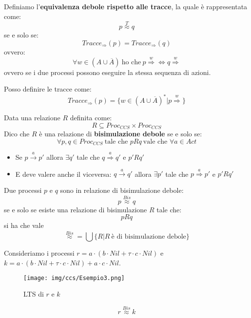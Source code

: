 \begin{definizione}
    Definiamo l'\textbf{equivalenza debole rispetto alle tracce}, la quale è rappresentata come: $$p \stackrel{T}{\approx} q$$ se e solo se: $$Tracce_{\Rightarrow} (p) = Tracce_{\Rightarrow}(q)$$ ovvero: $$\forall w \in (A \cup \overline{A}) \ \text{ho che} \ p \stackrel{w}{\Rightarrow} \iff q \stackrel{w}{\Rightarrow}$$ ovvero se i due processi possono eseguire la stessa sequenza di azioni.
\end{definizione}
Posso definire le tracce come: $$Tracce_{\Rightarrow}(p) = \{w \in (A \cup \overline{A})^{\ast} | p \stackrel{w}{\Rightarrow}\}$$
\begin{definizione}
    Data una relazione $R$ definita come: $$R \subseteq Proc_{CCS} \times Proc_{CCS}$$ Dico che $R$ è una relazione di \textbf{bisimulazione debole} se e solo se: $$\forall p, q \in Proc_{CCS} \ \text{tale che } p R q \ \text{vale che } \forall a \in Act$$
    \begin{itemize}
        \item Se $p \xrightarrow{a} p'$ allora $\exists q'$ tale che $q \stackrel{a}{\Rightarrow} q'$ e $p'Rq'$
        \item E deve valere anche il viceversa: $q \xrightarrow{a} q'$ allora $\exists p'$ tale che $p \stackrel{a}{\Rightarrow} p'$ e $p'Rq'$
    \end{itemize}
\end{definizione}
Due processi $p$ e $q$ sono in relazione di bisimulazione debole: $$p \stackrel{Bis}{\approx} q$$ se e solo se esiste una relazione di bisimulazione $R$ tale che: $$p R q$$ si ha che vale $$\stackrel{Bis}{\approx} = \bigcup \{R | R \ \text{è di bisimulazione debole}\}$$
\begin{esempio}
     Consideriamo i processi $r = a \cdot (b \cdot Nil + \tau \cdot c \cdot Nil)$ e $k = a \cdot (b \cdot Nil + \tau \cdot c \cdot Nil) + a \cdot c \cdot Nil$.
    \begin{figure}[!ht]
        \centering
        \texttt{[image: img/ccs/Esempio3.png]}
        \caption{LTS di $r$ e $k$}
    \end{figure}
    $$r \stackrel{Bis}{\approx} k$$
\end{esempio}
\newpage
